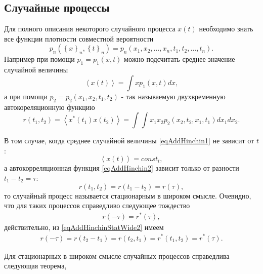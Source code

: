 \subsection{Случайные процессы}
Для полного описания некоторого случайного процесса $x\left(t\right)$
необходимо знать все функции плотности совместной вероятности
\[
p_n\left(\left\{x\right\}_n,\left\{t\right\}_n\right) = 
p_n\left(x_1,x_2,\dots,x_n,t_1,t_2,\dots,t_n\right).
\] 
Например при помощи $p_1 = p_1\left(x,t\right)$ можно подсчитать среднее 
значение случайной величины
\begin{equation}
\left<x\left(t\right)\right> = \int x p_1\left(x,t\right) dx,
\label{eqAddHinchin1}
\end{equation}
а при помощи $p_2 = p_2\left(x_1,x_2,t_1,t_2\right)$ - так называемую
двухвременную автокореляционную функцию  
\begin{equation}
r\left(t_1, t_2\right) = \left<x^{*}\left(t_1\right) x\left(t_2\right)\right> = \int
\int x_1 x_2 p_2\left(x_2,t_2,x_1,t_1\right)dx_1 dx_2.
\label{eqAddHinchin2}
\end{equation}

В том случае, когда среднее случайной величины \eqref{eqAddHinchin1} не
зависит от $t$:
\begin{equation}
\left<x\left(t\right)\right> = const_t,
\label{eqAddHinchinStatWide1}
\end{equation}
а автокорреляционная функция \eqref{eqAddHinchin2} зависит только от
разности $t_1 - t_2 = \tau$:
\begin{equation}
r\left(t_1, t_2\right) = r\left(t_1 - t_2\right) = r\left(\tau\right),
\label{eqAddHinchinStatWide2}
\end{equation}
то случайный процесс называется стационарным в широком
смысле. Очевидно, что для таких процессов справедливо следующее
тождество
\begin{eqnarray}
r\left(- \tau\right) = r^{*}\left(\tau\right),
\label{eqAddHinchinStatWide3}
\end{eqnarray}
действительно, из \eqref{eqAddHinchinStatWide2} имеем
\begin{eqnarray}
r\left(- \tau\right) = r\left(t_2 - t_1\right) = r\left(t_2,
t_1\right) = r^{*}\left(t_1, t_2\right) = r^{*}\left(\tau\right).
\nonumber
\end{eqnarray}


Для стационарных в широком смысле случайных процессов справедлива
следующая теорема,

